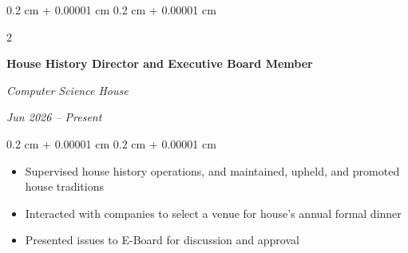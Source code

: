 \documentclass[10pt, letterpaper]{article}
\newenvironment{highlights}{
    \begin{itemize}[
        topsep=0.10 cm,
        parsep=0.10 cm,
        partopsep=0pt,
        itemsep=0pt,
        leftmargin=0.4 cm + 10pt
    ]
}{
    \end{itemize}
} %
\newenvironment{onecolentry}{
    \begin{adjustwidth}{
        0.2 cm + 0.00001 cm
    }{
        0.2 cm + 0.00001 cm
    }
}{
    \end{adjustwidth}
} %
\newenvironment{twocolentry}[2][]{
    \onecolentry
    \def\secondColumn{#2}
    \setcolumnwidth{\fill, 5.5 cm}
    \begin{paracol}{2}
}{
    \switchcolumn \raggedleft \secondColumn
    \end{paracol}
    \endonecolentry
} %
\begin{document}
    \begin{twocolentry}{
    \textit{Jun 2026 – Present}}
    
    \textbf{House History Director and Executive Board Member} 
    
    \textit{Computer Science House}
        
    \end{twocolentry}
    \begin{onecolentry}
        \begin{highlights} 
            \item Supervised house history operations, and maintained, upheld, and promoted house traditions
            \item Interacted with companies to select a venue for house's annual formal dinner %
            \item Presented issues to E-Board for discussion and approval
        \end{highlights}
    \end{onecolentry}

    \vspace{0.20 cm}
\end{document}

